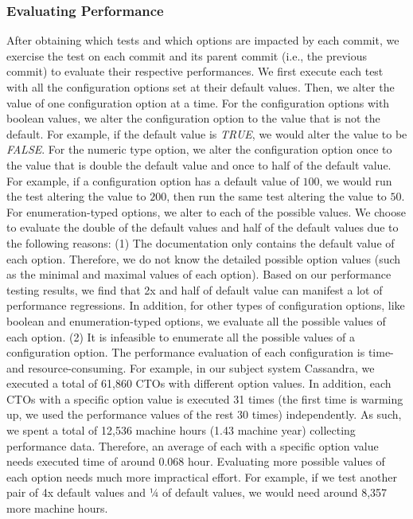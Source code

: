 \subsubsection{Evaluating Performance}
\label{evaluation}
After obtaining which tests and which options are impacted by each commit, we exercise the test on each commit and its parent commit (i.e., the previous commit) to evaluate their respective performances. %
We first execute each test with all the configuration options set at their default values. Then, we alter the value of one configuration option at a time. For the configuration options with boolean values, we alter the configuration option to the value that is not the default. For example, if the default value is \emph{TRUE}, we would alter the value to be \emph{FALSE}. For the numeric type option, we alter the configuration option once to the value that is double the default value and once to half of the default value. For example, if a configuration option has a default value of $100$, we would run the test altering the value to $200$, then run the same test altering the value to $50$. %
For enumeration-typed options, we alter to each of the possible values.%
We choose to evaluate the double of the default values and half of the default values due to the following reasons: 
(1) The documentation only contains the default value of each option. Therefore, we do not know the detailed possible option values (such as the minimal and maximal values of each option). Based on our performance testing results, we find that 2x and half of default value can manifest a lot of performance regressions. In addition, for other types of configuration options, like boolean and enumeration-typed options, we evaluate all the possible values of each option.
(2) It is infeasible to enumerate all the possible values of a configuration option. The performance evaluation of each configuration is time- and resource-consuming. For example, in our subject system Cassandra, we executed a total of 61,860 CTOs with different option values. In addition, each CTOs with a specific option value is executed 31 times (the first time is warming up, we used the performance values of the rest 30 times) independently. As such, we spent a total of 12,536 machine hours (1.43 machine year) collecting performance data. Therefore, an average of each \instance with a specific option value needs executed time of around 0.068 hour. Evaluating more possible values of each option needs much more impractical effort. For example, if we test another pair of 4x default values and ¼ of default values, we would need around 8,357 more machine hours. 


